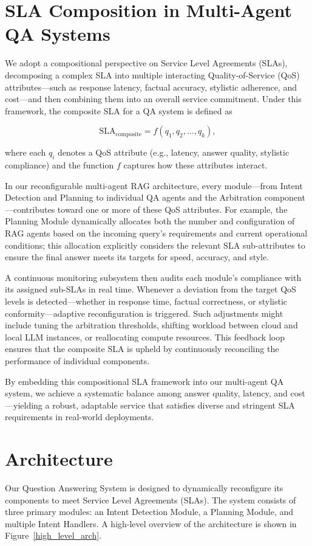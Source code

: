 \documentclass[sigconf,nonacm]{acmart}
\begin{document}
\section{SLA Composition in Multi-Agent QA Systems}
We adopt a compositional perspective on Service Level Agreements (SLAs), decomposing a complex SLA into multiple interacting Quality-of-Service (QoS) attributes—such as response latency, factual accuracy, stylistic adherence, and cost—and then combining them into an overall service commitment. Under this framework, the composite SLA for a QA system is defined as

\[
\mathrm{SLA}_{\mathrm{composite}} = f(q_1, q_2, \dots, q_k),
\]

where each \(q_i\) denotes a QoS attribute (e.g., latency, answer quality, stylistic compliance) and the function \(f\) captures how these attributes interact.

In our reconfigurable multi-agent RAG architecture, every module—from Intent Detection and Planning to individual QA agents and the Arbitration component—contributes toward one or more of these QoS attributes. For example, the Planning Module dynamically allocates both the number and configuration of RAG agents based on the incoming query’s requirements and current operational conditions; this allocation explicitly considers the relevant SLA sub-attributes to ensure the final answer meets its targets for speed, accuracy, and style.

A continuous monitoring subsystem then audits each module’s compliance with its assigned sub-SLAs in real time. Whenever a deviation from the target QoS levels is detected—whether in response time, factual correctness, or stylistic conformity—adaptive reconfiguration is triggered. Such adjustments might include tuning the arbitration thresholds, shifting workload between cloud and local LLM instances, or reallocating compute resources. This feedback loop ensures that the composite SLA is upheld by continuously reconciling the performance of individual components.

By embedding this compositional SLA framework into our multi-agent QA system, we achieve a systematic balance among answer quality, latency, and cost—yielding a robust, adaptable service that satisfies diverse and stringent SLA requirements in real-world deployments.


\section{Architecture}
Our Question Answering System is designed to dynamically reconfigure its components to meet Service Level Agreements (SLAs). The system consists of three primary modules: an Intent Detection Module, a Planning Module, and multiple Intent Handlers. A high-level overview of the architecture is shown in Figure~\ref{high_level_arch}.
\end{document}
